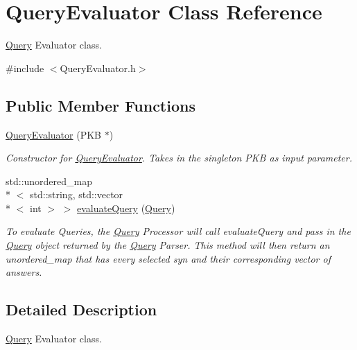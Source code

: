 \hypertarget{class_query_evaluator}{\section{Query\+Evaluator Class Reference}
\label{class_query_evaluator}
}


\hyperlink{class_query}{Query} Evaluator class.  




{\ttfamily \#include $<$Query\+Evaluator.\+h$>$}

\subsection*{Public Member Functions}
\begin{DoxyCompactItemize}
\item 
\hypertarget{class_query_evaluator_a861e04948c25774d74a7dcb4137864aa}{\hyperlink{class_query_evaluator_a861e04948c25774d74a7dcb4137864aa}{Query\+Evaluator} (P\+K\+B $\ast$)}\label{class_query_evaluator_a861e04948c25774d74a7dcb4137864aa}

\begin{DoxyCompactList}\small\item\em Constructor for \hyperlink{class_query_evaluator}{Query\+Evaluator}. Takes in the singleton P\+K\+B as input parameter. \end{DoxyCompactList}\item 
\hypertarget{class_query_evaluator_a3b4e7218194d6338941eee6ba5a1cd42}{std\+::unordered\+\_\+map\\*
$<$ std\+::string, std\+::vector\\*
$<$ int $>$ $>$ \hyperlink{class_query_evaluator_a3b4e7218194d6338941eee6ba5a1cd42}{evaluate\+Query} (\hyperlink{class_query}{Query})}\label{class_query_evaluator_a3b4e7218194d6338941eee6ba5a1cd42}

\begin{DoxyCompactList}\small\item\em To evaluate Queries, the \hyperlink{class_query}{Query} Processor will call evaluate\+Query and pass in the \hyperlink{class_query}{Query} object returned by the \hyperlink{class_query}{Query} Parser. This method will then return an unordered\+\_\+map that has every selected syn and their corresponding vector of answers. \end{DoxyCompactList}\end{DoxyCompactItemize}


\subsection{Detailed Description}
\hyperlink{class_query}{Query} Evaluator class. 


